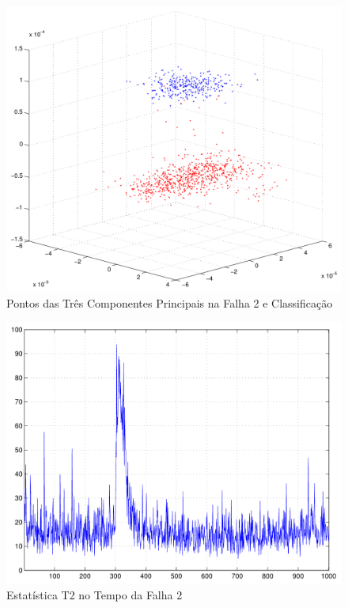 \documentclass[journal]{IEEEtran}
\begin{document}
\begin{figure}[H]
	\centering
  \includegraphics[scale=0.6]{figs/fault2/pontos3D.pdf}
  \caption{Pontos das Três Componentes Principais na Falha 2 e Classificação}
	\label{fig:f2:3d}
\end{figure}

\begin{figure}[H]
	\centering
  \includegraphics[scale=0.6]{figs/fault2/T2_tempo.pdf}
  \caption{Estatística T2 no Tempo da Falha 2}
	\label{fig:f2:t2}
\end{figure}
\end{document}
